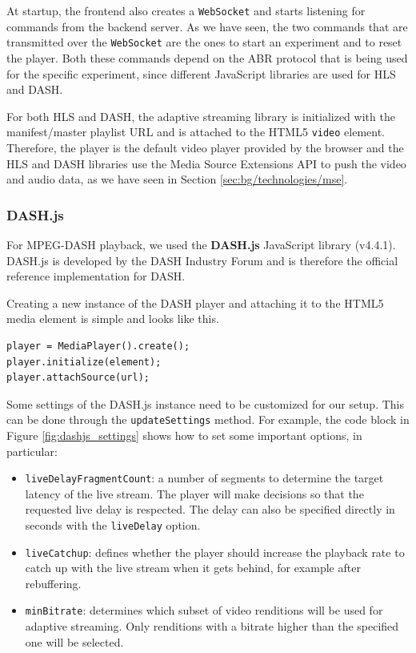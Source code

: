 At startup, the frontend also creates a \texttt{WebSocket} and starts listening for commands from the backend server. As we have seen, the two commands that are transmitted over the \texttt{WebSocket} are the ones to start an experiment and to reset the player. Both these commands depend on the ABR protocol that is being used for the specific experiment, since different JavaScript libraries are used for HLS and DASH.

For both HLS and DASH, the adaptive streaming library is initialized with the manifest/master playlist URL and is attached to the HTML5 \texttt{video} element. Therefore, the player is the default video player provided by the browser and the HLS and DASH libraries use the Media Source Extensions API to push the video and audio data, as we have seen in Section \ref{sec:bg/technologies/mse}.

\subsubsection{DASH.js}
\label{sec:eval/testbed/frontend/dashjs}

For MPEG-DASH playback, we used the \textbf{DASH.js} JavaScript library (v4.4.1). DASH.js is developed by the DASH Industry Forum and is therefore the official reference implementation for DASH.

Creating a new instance of the DASH player and attaching it to the HTML5 media element is simple and looks like this.

\begin{verbatim}
player = MediaPlayer().create();
player.initialize(element);
player.attachSource(url);
\end{verbatim}

Some settings of the DASH.js instance need to be customized for our setup. This can be done through the \texttt{updateSettings} method. For example, the code block in Figure \ref{fig:dashjs_settings} shows how to set some important options, in particular:

\begin{itemize}
    \item \texttt{liveDelayFragmentCount}: a number of segments to determine the target latency of the live stream. The player will make decisions so that the requested live delay is respected. The delay can also be specified directly in seconds with the \texttt{liveDelay} option.
    \item \texttt{liveCatchup}: defines whether the player should increase the playback rate to catch up with the live stream when it gets behind, for example after rebuffering.
    \item \texttt{minBitrate}: determines which subset of video renditions will be used for adaptive streaming. Only renditions with a bitrate higher than the specified one will be selected.
\end{itemize}

